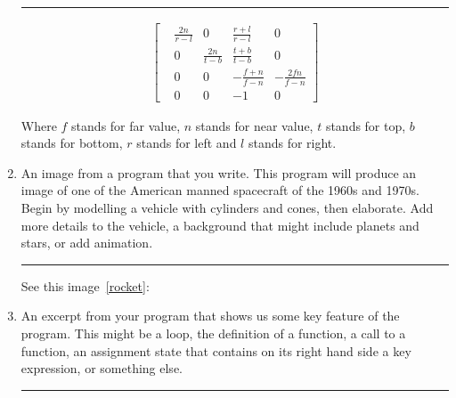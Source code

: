 \documentclass[oneside]{article}
\newenvironment{answer}
  {\vspace*{0.2cm} \rule{12cm}{0.02cm} \vspace*{0.2cm}}
  {\vspace*{0.2cm}}
\begin{document}
\begin{enumerate}
	      \begin{answer}
	      	\begin{align*}
	      		\begin{bmatrix}
	      		  & \frac{2n}{r-l} & 0              & \frac{r+l}{r-l}  & 0                \\
	      		  & 0              & \frac{2n}{t-b} & \frac{t+b}{t-b}  & 0                \\
	      		  & 0              & 0              & -\frac{f+n}{f-n} & -\frac{2fn}{f-n} \\
	      		  & 0              & 0              & -1               & 0
	      		\end{bmatrix}
	      	\end{align*}

	      	Where $f$ stands for far value, $n$ stands for near value, $t$ stands for top, $b$ stands for bottom, $r$ stands for left and $l$ stands for right.
	      \end{answer}

	\item An image from a program that you write. This program will produce an image of one of the American manned spacecraft of the 1960s and 1970s. Begin by modelling a vehicle with cylinders and cones, then elaborate. Add more details to the vehicle, a background that might include planets and stars, or add animation.

	      \begin{answer}

	      	See this image~\ref{rocket}:

	      \end{answer}

	\item An excerpt from your program that shows us some key feature of the program. This might be a loop, the definition of a function, a call to a function, an assignment state that contains on its right hand side a key expression, or something else.

	      \begin{answer}
	      	\inputminted[firstline=31, lastline=55]{js}{spaceship/scripts/main.js}
	      \end{answer}



\end{enumerate}
\end{document}
